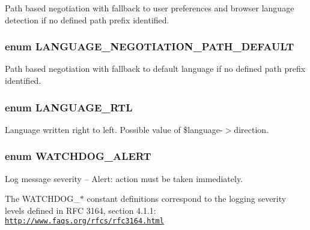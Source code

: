 Path based negotiation with fallback to user preferences and browser language detection if no defined path prefix identified. \hypertarget{bootstrap_8inc_1614b466569aa36b6c7214c154ec766b}{
\subsubsection[{LANGUAGE\_\-NEGOTIATION\_\-PATH\_\-DEFAULT}]{\setlength{\rightskip}{0pt plus 5cm}enum {\bf LANGUAGE\_\-NEGOTIATION\_\-PATH\_\-DEFAULT}}}
\label{bootstrap_8inc_1614b466569aa36b6c7214c154ec766b}


Path based negotiation with fallback to default language if no defined path prefix identified. \hypertarget{bootstrap_8inc_c3c2ed4c787f238d2d39d644dbdcb6d4}{
\subsubsection[{LANGUAGE\_\-RTL}]{\setlength{\rightskip}{0pt plus 5cm}enum {\bf LANGUAGE\_\-RTL}}}
\label{bootstrap_8inc_c3c2ed4c787f238d2d39d644dbdcb6d4}


Language written right to left. Possible value of \$language-$>$direction. \hypertarget{bootstrap_8inc_9fdd40d55b14109f09f091f401f237c0}{
\subsubsection[{WATCHDOG\_\-ALERT}]{\setlength{\rightskip}{0pt plus 5cm}enum {\bf WATCHDOG\_\-ALERT}}}
\label{bootstrap_8inc_9fdd40d55b14109f09f091f401f237c0}


Log message severity -- Alert: action must be taken immediately.

The WATCHDOG\_\-$\ast$ constant definitions correspond to the logging severity levels defined in RFC 3164, section 4.1.1: \href{http://www.faqs.org/rfcs/rfc3164.html}{\tt http://www.faqs.org/rfcs/rfc3164.html}

